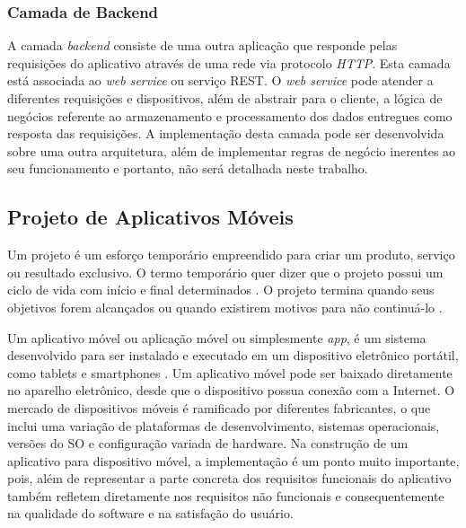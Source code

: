 \subsubsection{Camada de Backend}
A camada \textit{backend} consiste de uma outra aplicação que responde pelas requisições do aplicativo através de uma rede via protocolo \textit{HTTP}. Esta camada está associada ao \textit{web service} ou serviço REST. O \textit{web service} pode atender a diferentes requisições e dispositivos, além de abstrair para o cliente, a lógica de negócios referente ao armazenamento e processamento dos dados entregues como resposta das requisições. A implementação desta camada pode ser desenvolvida sobre uma outra arquitetura, além de implementar regras de negócio inerentes ao seu funcionamento e portanto, não será detalhada neste trabalho.


\subsection{Projeto de Aplicativos Móveis} %
Um projeto é um esforço temporário empreendido para criar um produto, serviço ou resultado exclusivo. O termo temporário quer dizer que o projeto possui um ciclo de vida com início e final determinados \cite{governanadetidotcom}. O projeto termina quando seus objetivos forem alcançados ou quando existirem motivos para não continuá-lo \cite{governanadetidotcom}.\par

Um aplicativo móvel ou aplicação móvel ou simplesmente \textit{app}, é um sistema desenvolvido para ser instalado e executado em um dispositivo eletrônico portátil, como tablets e smartphones \cite{what_is_mobile}. Um aplicativo móvel pode ser baixado diretamente no aparelho eletrônico, desde que o dispositivo possua conexão com a Internet. O mercado de dispositivos móveis é ramificado por diferentes fabricantes, o que inclui uma variação de plataformas de desenvolvimento, sistemas operacionais, versões do SO e configuração variada de hardware. Na construção de um aplicativo para dispositivo móvel, a implementação é um ponto muito importante, pois, além de representar a parte concreta dos requisitos funcionais do aplicativo também refletem diretamente nos requisitos não funcionais e consequentemente na qualidade do software e na satisfação do usuário.\par

